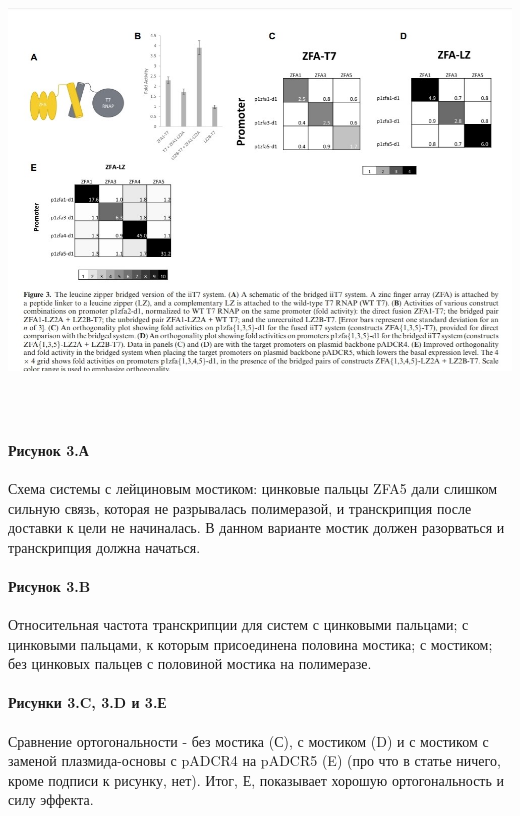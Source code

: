 \includegraphics[width=16cm, height=12cm]{Pictures/6_3}

\paragraph{Рисунок 3.А}

Схема системы с лейциновым мостиком: цинковые пальцы ZFA5 дали слишком сильную связь, которая не разрывалась полимеразой, и транскрипция после доставки к цели не начиналась. В данном варианте мостик должен разорваться и транскрипция должна начаться.

\paragraph{Рисунок 3.B}

Относительная частота транскрипции для систем с цинковыми пальцами; с цинковыми пальцами, к которым присоединена половина мостика; с мостиком; без цинковых пальцев с половиной мостика на полимеразе.

\paragraph{Рисунки 3.C, 3.D и 3.Е}

Сравнение ортогональности - без мостика (С), с мостиком (D) и с мостиком с заменой плазмида-основы с pADCR4 на pADCR5 (E) (про что в статье ничего, кроме подписи к рисунку, нет). Итог, Е, показывает хорошую ортогональность и силу эффекта.


